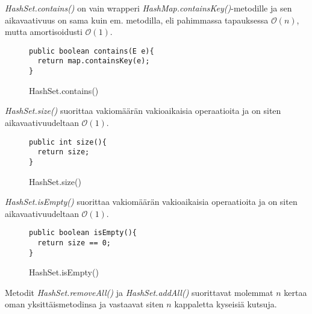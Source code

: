 \documentclass[12pt,a4paper]{article}
\begin{document}
\textit{HashSet.contains()} on vain wrapperi \textit{HashMap.containsKey()}-metodille ja sen aikavaativuus on sama kuin em. metodilla, eli pahimmassa tapauksessa $ \mathcal{O}(n)$, mutta amortisoidusti $\mathcal{O}(1)$.
\begin{figure}[H]
\begin{lstlisting}
public boolean contains(E e){
  return map.containsKey(e);
}
\end{lstlisting}
\caption{HashSet.contains()}
\end{figure}

\textit{HashSet.size()} suorittaa vakiomäärän vakioaikaisia operaatioita ja on siten aikavaativuudeltaan $\mathcal{O}(1)$.
\begin{figure}[H]
\begin{lstlisting}
public int size(){
  return size;
}
\end{lstlisting}
\caption{HashSet.size()}
\end{figure}

\textit{HashSet.isEmpty()} suorittaa vakiomäärän vakioaikaisia operaatioita ja on siten aikavaativuudeltaan $\mathcal{O}(1)$.
\begin{figure}[H]
\begin{lstlisting}
public boolean isEmpty(){
  return size == 0;
}
\end{lstlisting}
\caption{HashSet.isEmpty()}
\end{figure}

Metodit \textit{HashSet.removeAll()} ja \textit{HashSet.addAll()} suorittavat molemmat $n$ kertaa oman yksittäismetodinsa ja vastaavat siten $n$ kappaletta kyseisiä kutsuja. 
\end{document}
